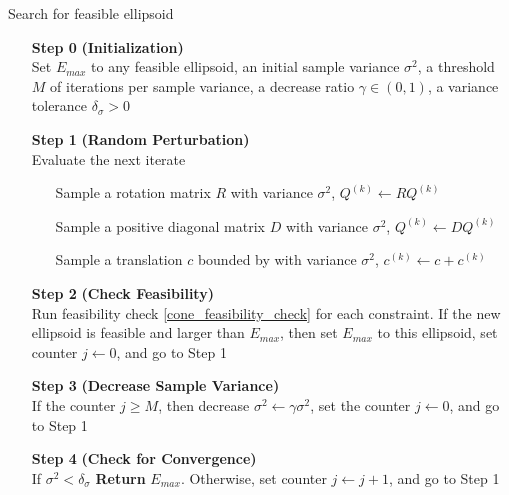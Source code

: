 \documentclass{article}
\theoremstyle{case}
\newcommand{\ck}{{c^{(k)}}}
\newcommand{\qk}{{Q^{(k)}}}
\begin{document}
\begin{algorithm}[H]
    \caption{Search for feasible ellipsoid}
    \label{constrained_dfo}
    \begin{itemize}
        \item[\textbf{Step 0}] \textbf{(Initialization)} \\
                Set $E_{max}$ to any feasible ellipsoid, 
                an initial sample variance $\sigma^2$, 
                a threshold $M$ of iterations per sample variance, 
                a decrease ratio $\gamma \in (0, 1)$, 
                a variance tolerance $\delta_{\sigma} > 0$
        
        \item[\textbf{Step 1}] \textbf{(Random Perturbation)} \\
            Evaluate the next iterate \begin{itemize}
                \item[] Sample a rotation matrix $R$ with variance $\sigma^2$, $\qk \gets R \qk$
                \item[] Sample a positive diagonal matrix $D$ with variance $\sigma^2$, $\qk \gets D \qk$
                \item[] Sample a translation $c$ bounded by with variance $\sigma^2$, $\ck \gets c + \ck$
            \end{itemize}
        
        \item[\textbf{Step 2}] \textbf{(Check Feasibility)} \\
            Run feasibility check \cref{cone_feasibility_check} for each constraint.
            If the new ellipsoid is feasible and larger than $E_{max}$, then 
            	set $E_{max}$ to this ellipsoid,
            	set counter $j \gets 0$, and
            	go to Step 1
        
        \item[\textbf{Step 3}] \textbf{(Decrease Sample Variance)} \\
            If the counter $j \ge M$, then
	    	decrease $\sigma^2 \gets \gamma \sigma^2$,
	    	set the counter $j\gets 0$, and
	    	go to Step 1
            
        \item[\textbf{Step 4}] \textbf{(Check for Convergence)} \\
	    If $\sigma^2 < \delta_{\sigma}$ \textbf{Return} $E_{max}$.
	    Otherwise, 
        		set counter $j \gets j + 1$, and
        		go to Step 1
    \end{itemize}
\end{algorithm}
\end{document}
